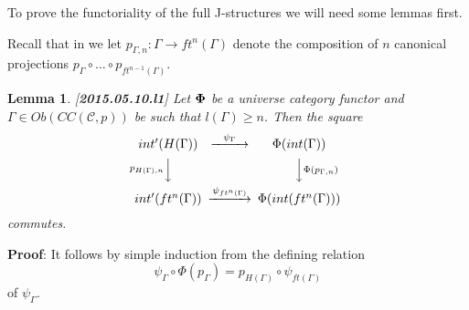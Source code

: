 \documentclass[12pt]{article}
\newenvironment{myproof}{{\bf Proof}:}{\vskip 5mm }
\newtheorem{lemma}[proposition]{Lemma}
\newcommand{\llabel}[1]{\label{#1}[{\bf #1}]}
\newcommand{\sr}{\rightarrow}
\begin{document}
To prove the functoriality of the full J-structures we will need some lemmas first.

Recall that in \cite{Csubsystems} we let $p_{\Gamma,n}:\Gamma\sr ft^n(\Gamma)$ denote the composition of $n$ canonical projections $p_{\Gamma}\circ \dots\circ p_{ft^{n-1}(\Gamma)}$. 
%
\begin{lemma}
\llabel{2015.05.10.l1}
Let ${\bf\Phi}$ be a universe category functor and $\Gamma\in Ob(CC({\mathcal C},p))$ be such that $l(\Gamma)\ge n$. Then the square
%
$$
\begin{CD}
int'(H(\Gamma)) @>\psi_{\Gamma}>> \Phi(int(\Gamma))\\
@Vp_{H(\Gamma),n} VV @VV\Phi(p_{\Gamma,n})V\\
int'(ft^n(\Gamma)) @>\psi_{ft^n(\Gamma)}>> \Phi(int(ft^n(\Gamma)))
\end{CD}
$$
%
commutes.
\end{lemma}
%
\begin{myproof}
It follows by simple induction from the defining relation
%
$$\psi_{\Gamma}\circ \Phi(p_{\Gamma})=p_{H(\Gamma)}\circ \psi_{ft(\Gamma)}$$
%
of $\psi_{\Gamma}$. 
\end{myproof}
\end{document}
